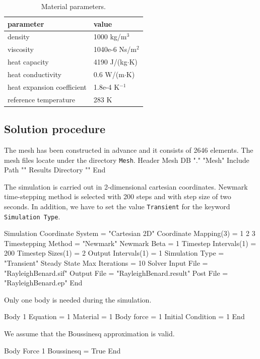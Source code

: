 \begin{flushleft}
\begin{table}[h]
\caption{Material parameters.}
\label{tb:matpar}
\begin{center}
\begin{tabular}{ll} \hline
parameter  & value \\ \hline
density & 1000 kg/m$^{3}$ \\
viscosity & 1040e-6 Ns/m$^{2}$ \\
heat capacity & 4190 J/(kg$\cdot$K) \\
heat conductivity & 0.6 W/(m$\cdot$K)       \\
heat expansion coefficient & 1.8e-4 K$^{-1}$      \\ 
reference temperature & 283 K       \\ \hline
\end{tabular}
\end{center}
\end{table}

\subsection*{Solution procedure}

The mesh has been constructed in advance and it consists of 2646 elements. 
The mesh files locate under the directory {\tt Mesh}.
\ttbegin
Header
  Mesh DB "." "Mesh"
  Include Path ""
  Results Directory ""
End
\ttend

The simulation is carried out in 2-dimensional cartesian coordinates. Newmark time-stepping method is selected with 200 steps and with step size of two seconds. In addition, we have to set the value {\tt Transient} for the keyword {\tt Simulation Type}.

\ttbegin
Simulation
  Coordinate System = "Cartesian 2D" 
  Coordinate Mapping(3) = 1 2 3
  Timestepping Method = "Newmark"
  Newmark Beta = 1
  Timestep Intervals(1) = 200
  Timestep Sizes(1) = 2
  Output Intervals(1) = 1
  Simulation Type = "Transient" 
  Steady State Max Iterations = 10
  Solver Input File = "RayleighBenard.sif"
  Output File = "RayleighBenard.result" 
  Post File = "RayleighBenard.ep" 
End
\ttend

Only one body is needed during the simulation.

\ttbegin
Body 1
  Equation = 1
  Material = 1
  Body force = 1
  Initial Condition = 1
End
\ttend

We assume that the Boussinesq approximation is valid.

\ttbegin
Body Force 1
  Boussinesq = True
End
\ttend


\end{flushleft}
